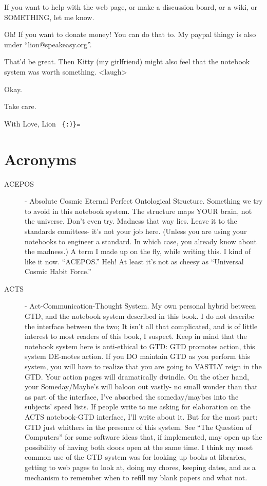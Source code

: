\documentclass[oneside]{book}
\begin{document}
If you want to help with the web page, or make a discussion board, or
a wiki, or SOMETHING, let me know.

Oh! If you want to donate money! You can do that to. My paypal thingy
is also under ``lion@speakeasy.org''.

That'd be great. Then Kitty (my girlfriend) might also feel that the
notebook system was worth something. <laugh>

Okay.

Take care.

With Love,
  Lion \verb| {:)}= |

\appendix

\chapter{Acronyms}
\begin{description}

\item[ACEPOS] - Absolute Cosmic Eternal Perfect Ontological
Structure. Something we try to avoid in this notebook system. The
structure maps YOUR brain, not the universe. Don't even try. Madness
that way lies. Leave it to the standards comittees- it's not your job
here. (Unless you are using your notebooks to engineer a standard. In
which case, you already know about the madness.) A term I made up on
the fly, while writing this. I kind of like it now. ``ACEPOS.'' Heh! At
least it's not as cheesy as ``Universal Cosmic Habit Force.''

\item[ACTS] - Act-Communication-Thought System. My own personal hybrid
between GTD, and the notebook system described in this book. I do not
describe the interface between the two; It isn't all that complicated,
and is of little interest to most readers of this book, I
suspect. Keep in mind that the notebook system here is anti-ethical to
GTD: GTD promotes action, this system DE-motes action. If you DO
maintain GTD as you perform this system, you will have to realize that
you are going to VASTLY reign in the GTD. Your action pages will
dramatically dwindle. On the other hand, your Someday/Maybe's will
baloon out vastly- no small wonder than that as part of the interface,
I've absorbed the someday/maybes into the subjects' speed lists. If
people write to me asking for elaboration on the ACTS notebook-GTD
interface, I'll write about it. But for the most part: GTD just
whithers in the presence of this system. See ``The Question of
Computers'' for some software ideas that, if implemented, may open up
the possibility of having both doors open at the same time. I think my
most common use of the GTD system was for looking up books at
libraries, getting to web pages to look at, doing my chores, keeping
dates, and as a mechanism to remember when to refill my blank papers
and what not.


\end{description}
\end{document}
